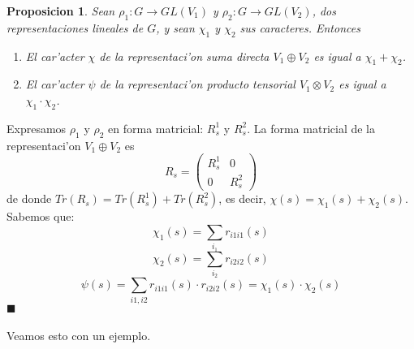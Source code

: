 \documentclass[a4paper,openright,12pt]{report}
\numberwithin{equation}{section} %
\newtheorem{proposicion}{Proposicion}[section] %
\newenvironment{proof}{\noindent{\it Demostracion:}}{\hfill$\blacksquare$} %
\begin{document}
\begin{proposicion}
Sean $\rho_{1}:G \rightarrow GL(V_{1})$ y  $\rho_{2}:G \rightarrow GL(V_{2})$, dos representaciones lineales de $G$, y sean $\chi_{1}$ y $\chi_{2}$ sus caracteres. Entonces
\begin{enumerate}
\item El car'acter $\chi$ de la representaci'on suma directa $V_{1} \oplus V_{2}$ es igual a $\chi_{1} + \chi_{2}$.
\item El car'acter $\psi$ de la representaci'on producto tensorial $V_{1} \otimes V_{2}$ es igual a $\chi_{1} \cdot \chi_{2}$.
\end{enumerate}
\end{proposicion}
\begin{proof}
Expresamos $\rho_{1}$ y $\rho_{2}$ en forma matricial: $R_{s}^{1}$ y $R_{s}^{2}$. La forma matricial de la representaci'on $V_{1} \oplus V_{2}$ es 
\[
R_{s}= \left(
\begin{array}{cc}
R_{s}^{1} & 0 \\
0 & R_{s}^{2}
\end{array}
\right)
\]
de donde $Tr(R_{s})=Tr(R_{s}^{1})+Tr(R_{s}^{2})$, es decir, $\chi(s)=\chi_{1}(s)+\chi_{2}(s)$. Sabemos que:
\[
\chi_{1}(s)=\sum_{i_{1}}r_{i1i1}(s)
\]
\[
\chi_{2}(s)=\sum_{i_{2}}r_{i2i2}(s)
\]
\[
\psi(s)=\sum_{i1,i2}r_{i1i1}(s)\cdot r_{i2i2}(s)=\chi_{1}(s) \cdot \chi_{2}(s)
\]
\end{proof}\\
\\
Veamos esto con un ejemplo.
\end{document}
